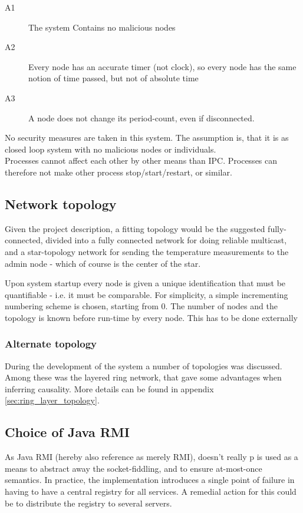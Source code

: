 \documentclass[10pt,a4paper]{article}
\begin{document}
\begin{description}
 \item[A1] The system Contains no malicious nodes
 \item[A2] Every node has an accurate timer (not clock), so every node has the same notion of time passed, but not of absolute time
 \item[A3] A node does not change its period-count, even if disconnected.
\end{description} 
No security measures are taken in this system. The assumption is, that it is as closed loop system with no malicious nodes or individuals.\\
Processes cannot affect each other by other means than IPC. Processes can therefore not make other process stop/start/restart, or similar.

\subsection{Network topology}
Given the project description, a fitting topology would be the suggested fully-connected, divided into a fully connected network for doing reliable multicast, and a star-topology network for sending the temperature measurements to the admin node - which of course is the center of the star.

Upon system startup every node is given a unique identification that must be quantifiable - i.e. it must be comparable. For simplicity, a simple incrementing numbering scheme is chosen, starting from 0. The number of nodes and the topology is known before run-time by every node. This has to be done externally

\subsubsection{Alternate topology}
During the development of the system a number of topologies was discussed. Among these was the layered ring network, that gave some advantages when inferring causality. More details can be found in appendix \ref{sec:ring_layer_topology}.

\subsection{Choice of Java RMI}
As Java RMI (hereby also reference as merely RMI), doesn't really p
is used as a means to abstract away the socket-fiddling, and to ensure at-most-once semantics. In practice, the implementation introduces a single point of failure in having to have a central registry for all services. A remedial action for this could be to distribute the registry to several servers.
\end{document}
